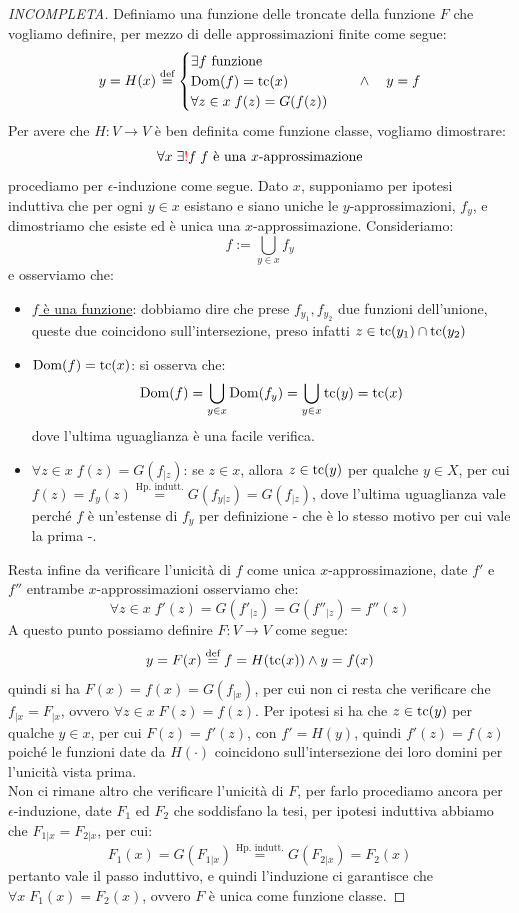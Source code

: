 \begin{proof}[INCOMPLETA]
	Definiamo una funzione delle troncate della funzione $F$ che vogliamo definire, per mezzo di delle approssimazioni finite come segue:
	\[ y = H(x) \overset{\text{def}}{=} \begin{cases}
		\text{$\exists f$ funzione} \\
		\operatorname{Dom}(f) = \operatorname{tc}(x) \\
		\forall z \in x \; f(z) = G(f(z))
	\end{cases} \quad \land \quad y = f
		\]
	Per avere che $H : V \to V$ \`e ben definita come funzione classe, vogliamo dimostrare:
	\[ \forall x \; \exists\textcolor{red}{!} f \;\text{$f$ \`e una $x$-approssimazione}
		\]
	procediamo per $\epsilon$-induzione come segue. Dato $x$, supponiamo per ipotesi induttiva che per ogni $y \in x$
	esistano e siano uniche le $y$-approssimazioni, $f_y$, e dimostriamo che esiste ed \`e unica una $x$-approssimazione.
	Consideriamo:
	\[ f := \bigcup_{y \in x}f_y
		\]	
	e osserviamo che:
	\begin{itemize}
		\item[$\diamondsuit$] \underline{$f$ \`e una funzione}: dobbiamo dire che prese $f_{y_1},f_{y_2}$ due funzioni dell'unione, queste due coincidono sull'intersezione, preso infatti $z \in \operatorname{tc}(y_1) \cap \operatorname{tc}(y_2)$
		\item[$\diamondsuit$] \underline{$\operatorname{Dom}(f) = \operatorname{tc}(x)$}: si osserva che:
		\[ \operatorname{Dom}(f) = \bigcup_{y \in x}\operatorname{Dom}(f_y) = \bigcup_{y \in x} \operatorname{tc}(y) = \operatorname{tc}(x)
			\]
		dove l'ultima uguaglianza \`e una facile verifica.
		\item[$\diamondsuit$] \underline{$\forall z \in x \; f(z) = G(f_{|z})$}: se $z \in x$, allora $z \in \operatorname{tc}(y)$ per qualche $y \in X$, per cui $f(z) = f_{y}(z) \overset{\text{Hp. indutt.}}{=} G(f_{y|z}) = G(f_{|z})$,
		dove l'ultima uguaglianza vale perch\'e $f$ \`e un'estense di $f_y$ per definizione - che \`e lo stesso motivo per cui vale la prima -.
	\end{itemize}
	Resta infine da verificare l'unicit\`a di $f$ come unica $x$-approssimazione, date $f'$ e $f''$ entrambe $x$-approssimazioni osserviamo che:
	\[ \forall z \in x \; f'(z) = G(f'_{|z}) = G(f''_{|z}) = f''(z)
		\]
	A questo punto possiamo definire $F : V \to V$ come segue:
	\[ y = F(x) \overset{\text{def}}{=} f = H(\operatorname{tc}(x)) \land y = f(x)
		\]
	quindi si ha $F(x) = f(x) = G(f_{|x})$, per cui non ci resta che verificare che $f_{|x} = F_{|x}$, ovvero $\forall z \in x \; F(z) = f(z)$.
	Per ipotesi si ha che $z \in \operatorname{tc}(y)$ per qualche $y \in x$, per cui $F(z) = f'(z)$, con $f' = H(y)$, quindi $f'(z) = f(z)$ poich\'e le funzioni date da $H(\cdot)$
	coincidono sull'intersezione dei loro domini per l'unicit\`a vista prima.\\
	Non ci rimane altro che verificare l'unicit\`a di $F$, per farlo procediamo ancora per $\epsilon$-induzione, date $F_1$ ed $F_2$ che soddisfano la tesi, per ipotesi induttiva abbiamo che $F_{1|x} = F_{2|x}$,
	per cui:
	\[ F_1(x) = G(F_{1|x}) \overset{\text{Hp. indutt.}}{=} G(F_{2|x}) = F_2(x)
		\]
	pertanto vale il passo induttivo, e quindi l'induzione ci garantisce che $\forall x \; F_1(x) = F_2(x)$, ovvero $F$ \`e unica come funzione classe.
\end{proof}